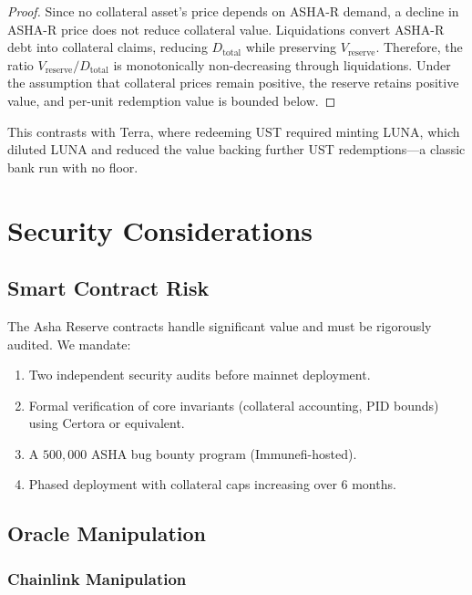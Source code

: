 \documentclass[11pt,a4paper]{article}
\newcommand{\asha}{\textsc{ASHA}\xspace}
\newcommand{\ashares}{\textsc{ASHA-R}\xspace}
\begin{document}
\begin{proof}
Since no collateral asset's price depends on \ashares demand, a decline in \ashares price does not reduce collateral value.
Liquidations convert \ashares debt into collateral claims, reducing $D_{\text{total}}$ while preserving $V_{\text{reserve}}$.
Therefore, the ratio $V_{\text{reserve}} / D_{\text{total}}$ is monotonically non-decreasing through liquidations.
Under the assumption that collateral prices remain positive, the reserve retains positive value, and per-unit redemption value is bounded below.
\end{proof}

This contrasts with Terra, where redeeming UST required minting LUNA, which diluted LUNA and reduced the value backing further UST redemptions---a classic bank run with no floor.

\section{Security Considerations}
\label{sec:security}

\subsection{Smart Contract Risk}

The Asha Reserve contracts handle significant value and must be rigorously audited.
We mandate:
\begin{enumerate}
  \item Two independent security audits before mainnet deployment.
  \item Formal verification of core invariants (collateral accounting, PID bounds) using Certora or equivalent.
  \item A $500{,}000$ \asha bug bounty program (Immunefi-hosted).
  \item Phased deployment with collateral caps increasing over $6$ months.
\end{enumerate}

\subsection{Oracle Manipulation}

\subsubsection{Chainlink Manipulation}
\end{document}
